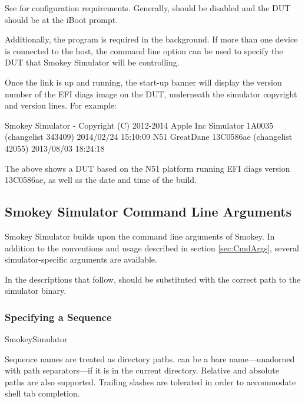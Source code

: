 See  for configuration requirements.  Generally,
 should be disabled and the DUT should be at the iBoot prompt.

Additionally, the  program is required in the background.  If
more than one device is connected to the host, the command line option
 can be used to specify the DUT that Smokey Simulator will
be controlling.

Once the link is up and running, the start-up banner will display the version
number of the EFI diags image on the DUT, underneath the simulator copyright
and version lines.  For example:

\begin{TerminalOutput}
Smokey Simulator - Copyright (C) 2012-2014 Apple Inc
Simulator 1A0035 (changelist 343409) 2014/02/24 15:10:09
N51 GreatDane 13C0586ae (changelist 42055) 2013/08/03 18:24:18
\end{TerminalOutput}

The above shows a DUT based on the N51 platform running EFI diags version
13C0586ae, as well as the date and time of the build.

\subsection{Smokey Simulator Command Line Arguments}
\label{sec:SimCmdArgs}

Smokey Simulator builds upon the command line arguments of Smokey.  In addition
to the conventions and usage described in section \ref{sec:CmdArgs}, several
simulator-specific arguments are available.

In the descriptions that follow,  should be
substituted with the correct path to the simulator binary.

\subsubsection{Specifying a Sequence}

\begin{CommandLine}
SmokeySimulator ~~
\end{CommandLine}

Sequence names are treated as directory paths.   can be a bare
name---unadorned with path separators---if it is in the current directory.
Relative and absolute paths are also supported.  Trailing slashes are tolerated
in order to accommodate shell tab completion.

